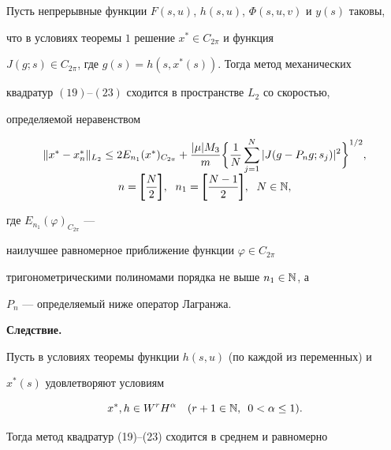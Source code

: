 \begin{thm}


Пусть непрерывные функции $F(s,u)$, $h(s,u)$, $\Phi(s,u,v)$ и $y(s)$ таковы,


что в условиях теоремы $1$ решение $x^*\in C_{2\pi}$ и функция


$J(g;s)\in C_{2\pi}$, где $g(s)=h(s,x^*(s))$. Тогда метод механических


квадратур $(19)$--$(23)$ сходится в пространстве $L_2$ со скоростью,


определяемой неравенством


\begin{equation}


\begin{array}{c}


\|x^*-x_n^*\|_{L_2}\leq 2 E_{n_1}(x^*)_{C_{2\pi}}+


\displaystyle\frac{|\mu | M_3}{m}


\biggl\{\frac{1}{N}\sum_{j=1}^N| J(g-P_ng;s_j)


|^2\biggr\}^{1/2},\\[3mm]


\displaystyle n=\pmb {\bigg [}\frac{N}{2}\pmb{\bigg ]},\ \;


n_1=\pmb{\bigg [}\frac{N-1}{2}\pmb{ \bigg ]},\ \; N\in \Bbb N,


\end{array}


\end{equation}


где $E_{n_1}(\varphi)_{C_{2\pi}}$ ---


наилучшее равномерное приближение функции $\varphi\in C_{2\pi}$


тригонометрическими полиномами порядка не выше $n_1\in \Bbb N$, а


$P_n$ --- определяемый ниже оператор Лагранжа.


\end{thm}





{\bf Следствие.}


Пусть в условиях теоремы функции $h(s,u)$ (по каждой из переменных) и


$x^*(s)$ удовлетворяют условиям


$$


x^*,h\in W^rH^\alpha \quad (r+1\in \Bbb N,\ \, 0<\alpha\leq 1).


$$


Тогда метод квадратур (19)--(23) сходится в среднем и равномерно


